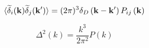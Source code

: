 \begin{equation}
\langle \widetilde{\delta}_i ({\bf k}) \widetilde{\delta}_j ({\bf k'}) \rangle = (2 \pi) ^3 \delta_D \left( {\bf k} - {\bf k'} \right) P_{ij} \left({\bf k} \right)
\end{equation}

\begin{equation}
    \Delta^2 \left( k \right) = \frac{k^3}{2 \pi ^2} P \left( k \right)
\end{equation}
